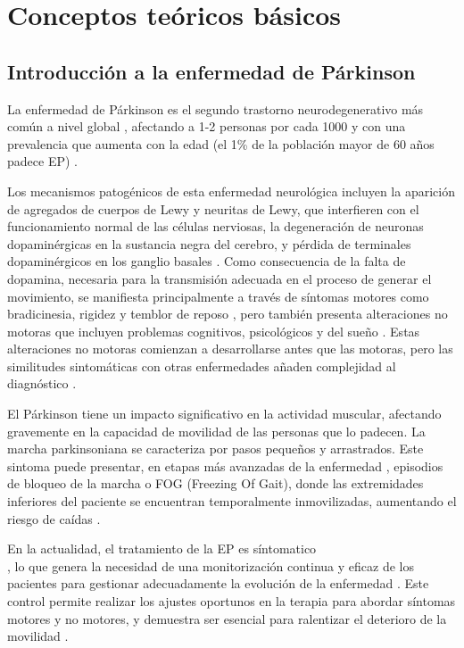 
\section{Conceptos teóricos básicos}


\subsection{Introducción a la enfermedad de Párkinson}

La enfermedad de Párkinson es el segundo trastorno neurodegenerativo más común a nivel global \cite{Art2}, afectando a 1-2 personas por cada 1000 y con una prevalencia que aumenta con la edad (el 1\% de la población mayor de 60 años padece EP) \cite{Art4}.

Los mecanismos patogénicos de esta enfermedad neurológica incluyen la aparición de agregados de cuerpos de Lewy y neuritas de Lewy, que interfieren con el funcionamiento normal de las células nerviosas, la degeneración de neuronas dopaminérgicas en la sustancia negra del cerebro, y pérdida de terminales dopaminérgicos en los ganglio basales \cite{Art1}. Como consecuencia de la falta de dopamina, necesaria para la transmisión adecuada en el proceso de generar el movimiento, se manifiesta principalmente a través de síntomas motores como bradicinesia, rigidez y temblor de reposo \cite{Art4}, pero también presenta alteraciones no motoras que incluyen problemas cognitivos, psicológicos y del sueño \cite{Art5} \cite{Art6}. Estas alteraciones no motoras comienzan a desarrollarse antes que las motoras, pero las similitudes sintomáticas con otras enfermedades añaden complejidad al diagnóstico \cite{Art1}.

El Párkinson tiene un impacto significativo en la actividad muscular, afectando gravemente en la capacidad de movilidad de las personas que lo padecen. La marcha parkinsoniana se caracteriza por pasos pequeños y arrastrados. Este sintoma puede presentar, en etapas más avanzadas de la enfermedad \cite{Art2}, episodios de bloqueo de la marcha o FOG (Freezing Of Gait), donde las extremidades inferiores del paciente se encuentran temporalmente inmovilizadas, aumentando el riesgo de caídas \cite{Art5} \cite{Art6}.

En la actualidad, el tratamiento de la EP es síntomatico\\ \cite{Art6}, lo que genera la necesidad de una monitorización continua y eficaz de los pacientes para gestionar adecuadamente la evolución de la enfermedad \cite{Art3}. Este control permite realizar los ajustes oportunos en la terapia para abordar síntomas motores y no motores, y demuestra ser esencial para ralentizar el deterioro de la movilidad \cite{Art6}.


